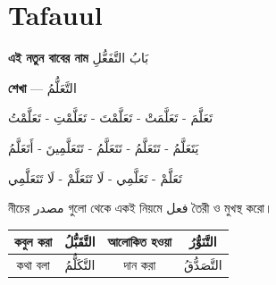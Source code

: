 \newpage
\section{Tafauul}

\begin{center}
  \textbf{এই নতুন বাবের নাম}
  \enspace
  {\arabicfont \textarabic{بَابُ التَّفَعُّلِ}}
\end{center}

\vspace{0.3cm}

\begin{center}
  \textbf{শেখা} \enspace---\enspace
  {\arabicfont \textarabic{التَّعَلُّمُ}}
\end{center}

\vspace{0.6cm}

\begin{center}
  {\arabicfont \Large
    \textarabic{تَعَلَّمَ - تَعَلَّمَتْ - تَعَلَّمْتَ - تَعَلَّمْتِ - تَعَلَّمْتُ}
  }
\end{center}

\vspace{0.4cm}

\begin{center}
  {\arabicfont \Large
    \textarabic{يَتَعَلَّمُ - تَتَعَلَّمُ - تَتَعَلَّمُ - تَتَعَلَّمِينَ - أَتَعَلَّمُ}
  }
\end{center}

\vspace{0.4cm}

\begin{center}
  {\arabicfont \Large
    \textarabic{تَعَلَّمْ - تَعَلَّمِي - لَا تَتَعَلَّمْ - لَا تَتَعَلَّمِي}
  }
\end{center}

\vspace{0.7cm}

\begin{center}
  নীচের {\arabicfont \textarabic{مصدر}} গুলো থেকে একই নিয়মে
  {\arabicfont \textarabic{فعل}} তৈরী ও মুখস্থ করো।
\end{center}

\vspace{0.5cm}

\setlength{\arrayrulewidth}{0.5pt}
\setlength{\tabcolsep}{4pt}
\renewcommand{\arraystretch}{2.0}

\noindent\begin{tabularx}{\textwidth}{|C|C|C|C|}
  \hline
  কবুল করা & {\arabicfont \textarabic{التَّقَبُّلُ}} &
  আলোকিত হওয়া & {\arabicfont \textarabic{التَّنَوُّرُ}} \\
  \hline

  কথা বলা & {\arabicfont \textarabic{التَّكَلُّمُ}} &
  দান করা & {\arabicfont \textarabic{التَّصَدُّقُ}} \\
  \hline
\end{tabularx}

